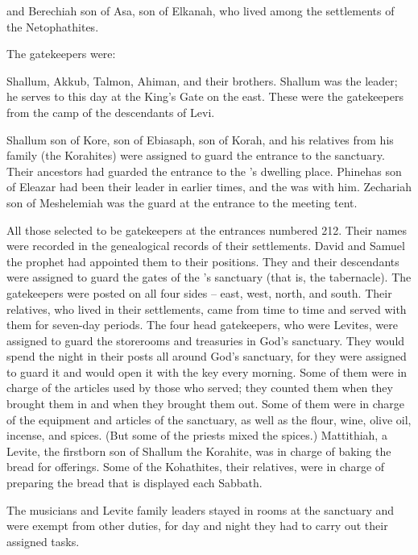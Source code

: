 {and Berechiah
son
of Asa,
son
of Elkanah,
who lived
among the settlements
of the Netophathites.
\par }{\PP {}The gatekeepers
were:
\par }{\PP Shallum,
Akkub,
Talmon,
Ahiman,
and their brothers.
Shallum
was the leader;
he serves
to this day at the King’s
Gate
on the east.
These
were the gatekeepers
from the camp
of the descendants
of Levi.
\par }{\PP {}Shallum
son
of Kore,
son
of Ebiasaph,
son
of
Korah,
and his relatives
from his family
(the Korahites) were assigned
to guard
the entrance
to the sanctuary.
Their ancestors
had guarded
the entrance
to the
{}’s
dwelling place.
Phinehas
son
of Eleazar
had been their leader
in earlier
times, and the
{}
was with him.
Zechariah
son
of Meshelemiah
was the guard
at the entrance
to the meeting
tent.
\par }{\PP {}All
those selected
to be gatekeepers
at the entrances
numbered
212.
Their
names were recorded in the genealogical records
of their settlements.
David
and Samuel
the prophet
had appointed
them
to their positions.
They
and their descendants
were assigned
to guard
the gates
of the
{}’s
sanctuary
(that is, the tabernacle).
The gatekeepers
were posted on all four
sides
– east,
west,
north,
and south.
Their relatives,
who lived in their settlements,
came
from time
to
time
and served with
them for seven-day periods.
The four
head gatekeepers,
who were
Levites,
were assigned to guard the storerooms
and treasuries
in God’s sanctuary.
They would spend the night in their posts
all around
God’s
sanctuary,
for
they
were assigned to guard
it and would open
it with the key every morning.
Some of them
were in charge
of the articles
used by those who served;
they counted
them when they brought
them in and when they brought them out.
Some of them
were in charge
of the equipment
and articles
of the sanctuary,
as well as the flour,
wine,
olive oil,
incense,
and spices.
(But some
of the priests
mixed
the spices.)
Mattithiah,
a Levite,
the firstborn son
of Shallum
the Korahite,
was in charge
of baking
the bread for offerings.
Some
of the Kohathites,
their relatives,
were in charge of preparing
the bread
that is displayed
each Sabbath.
\par }{\PP {}The musicians
and Levite
family
leaders
stayed in rooms
at the sanctuary and were exempt
from other duties, for
day
and night
they had to carry out their assigned tasks.
}
